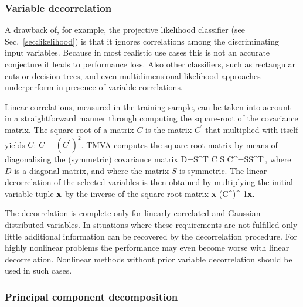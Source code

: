 \subsubsection{Variable decorrelation}
\label{sec:decorrelation}

A drawback of, for example, the projective likelihood classifier (see 
Sec.~\ref{sec:likelihood}) is that it ignores correlations among the discriminating 
input variables. Because in most realistic use cases this is not an accurate 
conjecture it leads to performance loss. Also other classifiers, such as rectangular 
cuts or decision trees, and even multidimensional likelihood approaches underperform
in presence of variable correlations.

Linear correlations, measured in the training sample, can be taken into account 
in a straightforward manner through computing the square-root of the covariance 
matrix. The square-root of a matrix $C$ is the matrix $C^\prime$ that multiplied 
with itself yields $C$: $C=(C^\prime)^2$. TMVA computes the square-root matrix 
by means of diagonalising the (symmetric) covariance matrix
\beq
    D=S^T C S \hspace{0.5cm}\Rightarrow \hspace{0.5cm}
    C^\prime=SS^T\,,
\eeq
where $D$ is a diagonal matrix, and where the matrix $S$ is symmetric. The linear 
decorrelation of the selected variables is then obtained by multiplying the 
initial variable tuple ${\bf x}$ by the inverse of the square-root matrix
\beq
      {\bf x} \mapsto (C^\prime)^{-1}{\bf x}\:.
\eeq


The decorrelation is complete only for linearly correlated and Gaussian distributed 
variables. In situations where these requirements are not fulfilled
only little additional information can be recovered by the decorrelation
procedure. For highly nonlinear problems the performance may even become
worse with linear decorrelation. Nonlinear methods without prior variable 
decorrelation should be used in such cases.





\subsubsection{Principal component decomposition}
\label{sec:pca}

